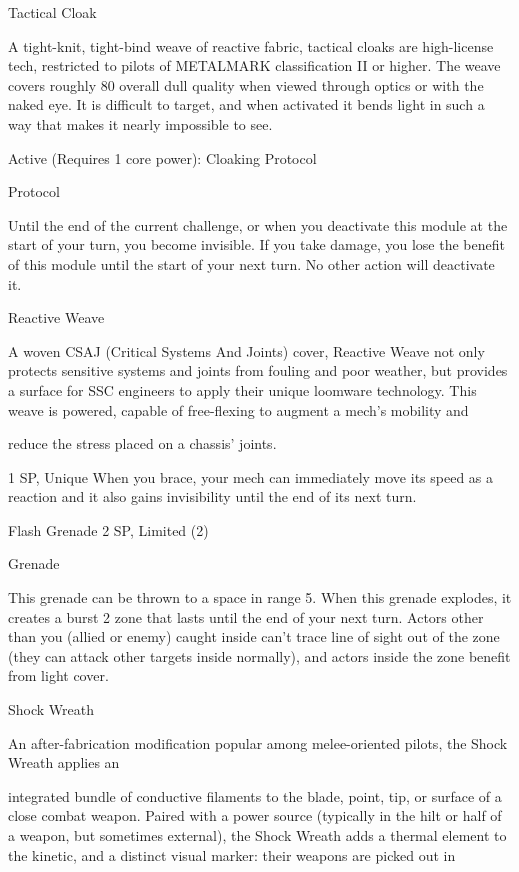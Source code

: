                                                  Tactical Cloak

 A tight-knit, tight-bind weave of reactive fabric, tactical cloaks are high-license tech, restricted to pilots
  of METALMARK classification II or higher. The weave covers roughly 80%
  overall dull quality when viewed through optics or with the naked eye. It is difficult to target, and when
 activated it bends light in such a way that makes it nearly impossible to see.

 Active (Requires 1 core power):
  Cloaking Protocol

  Protocol

  Until the end of the current challenge, or when you deactivate this module at the start of your turn, you
  become invisible. If you take damage, you lose the benefit of this module until the start of your next
  turn. No other action will deactivate it.

Reactive Weave

A woven CSAJ (Critical Systems And Joints) cover, Reactive Weave not only protects sensitive systems and
joints from fouling and poor weather, but provides a surface for SSC engineers to apply their unique
loomware technology. This weave is powered, capable of free-flexing to augment a mech’s mobility and

reduce the stress placed on a chassis’ joints.




1 SP, Unique
When you brace, your mech can immediately move its speed as a reaction and it also gains
invisibility until the end of its next turn.


Flash Grenade
2 SP, Limited (2)

Grenade


This grenade can be thrown to a space in range 5. When this grenade explodes, it creates a
burst 2 zone that lasts until the end of your next turn. Actors other than you (allied or enemy)
caught inside can’t trace line of sight out of the zone (they can attack other targets inside
normally), and actors inside the zone benefit from light cover.


Shock Wreath

An after-fabrication modification popular among melee-oriented pilots, the Shock Wreath applies an

integrated bundle of conductive filaments to the blade, point, tip, or surface of a close combat weapon.
Paired with a power source (typically in the hilt or half of a weapon, but sometimes external), the Shock
Wreath adds a thermal element to the kinetic, and a distinct visual marker: their weapons are picked out in

